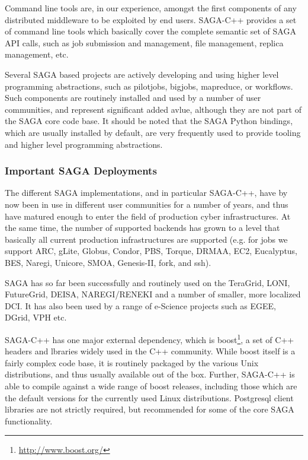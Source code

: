 \documentclass[12pt]{article}
\begin{document}
  Command line tools are, in our experience, amongst the first
  components of any distributed middleware to be exploited by end
  users.  SAGA-C++ provides a set of command line tools which
  basically cover the complete semantic set of SAGA API calls, such as
  job submission and management, file management, replica management,
  etc.

  Several SAGA based projects are actively developing and using higher
  level programming abstractions, such as pilotjobs, bigjobs,
  mapreduce, or workflows.  Such components are routinely installed
  and used by a number of user communities, and represent significant
  added avlue, although they are not part of the SAGA core code base.
  It should be noted that the SAGA Python bindings, which are usually
  installed by default, are very frequently used to provide tooling and
  higher level programming abstractions.

 \subsubsection{Important SAGA Deployments}

  The different SAGA implementations, and in particular SAGA-C++, have
  by now been in use in different user communities for a number of
  years, and thus have matured enough to enter the  field of
  production cyber infrastructures.  At the same time, the number of
  supported backends has grown to a level that basically all current
  production infrastructures are supported (e.g. for jobs we support
  ARC, gLite, Globus, Condor, PBS, Torque, DRMAA, EC2, Eucalyptus,
  BES,  Naregi, Unicore, SMOA, Genesis-II, fork, and ssh).  

  SAGA has so far been successfully and routinely used on the
  TeraGrid, LONI, FutureGrid, DEISA, NAREGI/RENEKI and a number of
  smaller, more localized DCI. It has also been used by a range of
  e-Science projects such as EGEE, DGrid, VPH etc.

  SAGA-C++ has one major external dependency, which is
  boost\footnote{\url{http://www.boost.org/}}, a set of C++ headers
  and lbraries widely used in the C++ community.  While boost itself
  is a fairly complex code base, it is routinely packaged by the
  various Unix distributions, and thus usually available out of the
  box.  Further, SAGA-C++ is able to compile against a wide range of
  boost releases, including those which are the default versions for
  the currently used Linux distributions.  Postgresql client libraries
  are not strictly required, but recommended for some of the core SAGA
  functionality.
\end{document}
